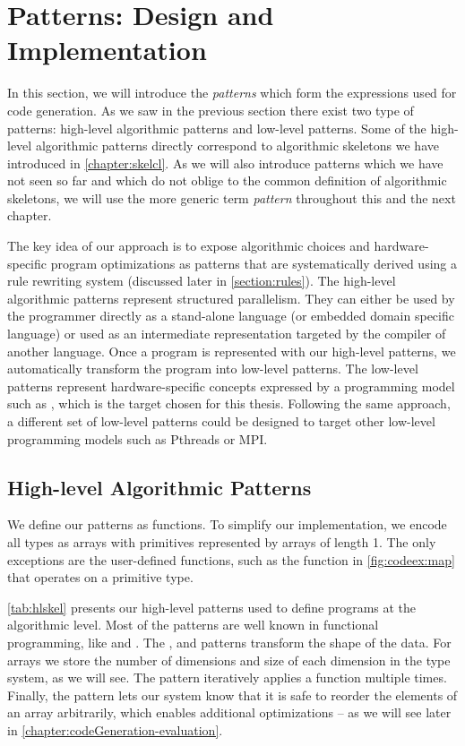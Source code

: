 \section{Patterns: Design and Implementation}
\label{section:patterns}

In this section, we will introduce the \emph{patterns} which form the expressions used for code generation.
As we saw in the previous section there exist two type of patterns: high-level algorithmic patterns and low-level \OpenCL patterns.
Some of the high-level algorithmic patterns directly correspond to algorithmic skeletons we have introduced in \autoref{chapter:skelcl}.
As we will also introduce patterns which we have not seen so far and which do not oblige to the common definition of algorithmic skeletons, we will use the more generic term \emph{pattern} throughout this and the next chapter.

The key idea of our approach is to expose algorithmic choices and hardware-specific program optimizations as patterns that are systematically derived using a rule rewriting system (discussed later in \autoref{section:rules}).
The high-level algorithmic patterns represent structured parallelism.
They can either be used by the programmer directly as a stand-alone language (or embedded domain specific language) or used as an intermediate representation targeted by the compiler of another language.
Once a program is represented with our high-level patterns, we automatically transform the program into low-level patterns.
The low-level patterns represent hardware-specific concepts expressed by a programming model such as \OpenCL, which is the target chosen for this thesis.
Following the same approach, a different set of low-level patterns could be designed to target other low-level programming models such as Pthreads or MPI.


\subsection{High-level Algorithmic Patterns}

We define our patterns as functions.
To simplify our implementation, we encode all types as arrays with primitives represented by arrays of length 1.
The only exceptions are the user-defined functions, such as the  function in \autoref{fig:codeex:map} that operates on a primitive type.

\autoref{tab:hlskel} presents our high-level patterns used to define programs at the algorithmic level.
Most of the patterns are well known in functional programming, like \map and \reduce.
The \zip, \splitN and \join patterns transform the shape of the data.
For arrays we store the number of dimensions and size of each dimension in the type system, as we will see.
The \iterateN pattern iteratively applies a function multiple times.
Finally, the \reorder pattern lets our system know that it is safe to reorder the elements of an array arbitrarily, which enables additional optimizations -- as we will see later in \autoref{chapter:codeGeneration-evaluation}.


